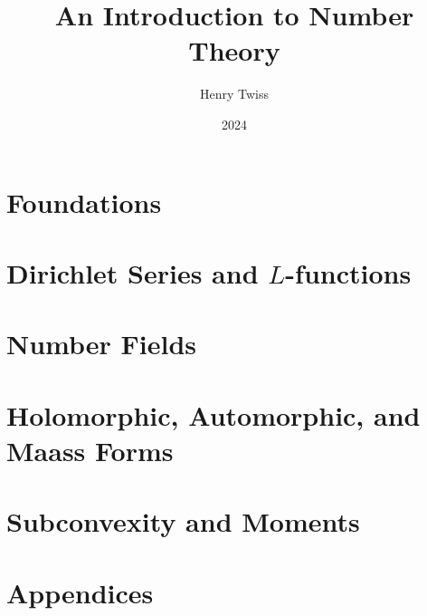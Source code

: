 \documentclass[12pt,oneside]{book}
\title{An Introduction to Number Theory}
\author{Henry Twiss}
\date{2024}
\begin{document}
\maketitle
\pagestyle{empty}
\tableofcontents
\setcounter{page}{0}
\pagestyle{fancy}

\part{Foundations}
  

\part{Dirichlet Series and \texorpdfstring{$L$}{L}-functions}
  
  
  

\part{Number Fields}
  
  
  
  

\part{Holomorphic, Automorphic, and Maass Forms}
  
  
  
  
  

\part{Subconvexity and Moments}
  
  
  


\part{Appendices}
  

\printindex


\end{document}

